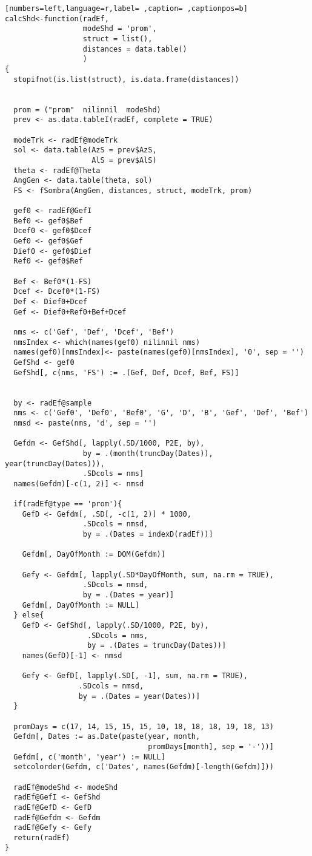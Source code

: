 \begin{lstlisting}[numbers=left,language=r,label= ,caption= ,captionpos=b]
calcShd<-function(radEf,
                  modeShd = 'prom',      
                  struct = list(), 
                  distances = data.table() 
                  )
{
  stopifnot(is.list(struct), is.data.frame(distances))


  prom = ("prom"  nilinnil  modeShd)
  prev <- as.data.tableI(radEf, complete = TRUE)

  modeTrk <- radEf@modeTrk
  sol <- data.table(AzS = prev$AzS,
                    AlS = prev$AlS)
  theta <- radEf@Theta
  AngGen <- data.table(theta, sol)
  FS <- fSombra(AngGen, distances, struct, modeTrk, prom)

  gef0 <- radEf@GefI
  Bef0 <- gef0$Bef
  Dcef0 <- gef0$Dcef
  Gef0 <- gef0$Gef
  Dief0 <- gef0$Dief
  Ref0 <- gef0$Ref

  Bef <- Bef0*(1-FS)
  Dcef <- Dcef0*(1-FS)
  Def <- Dief0+Dcef
  Gef <- Dief0+Ref0+Bef+Dcef 

  nms <- c('Gef', 'Def', 'Dcef', 'Bef')
  nmsIndex <- which(names(gef0) nilinnil nms)
  names(gef0)[nmsIndex]<- paste(names(gef0)[nmsIndex], '0', sep = '')
  GefShd <- gef0
  GefShd[, c(nms, 'FS') := .(Gef, Def, Dcef, Bef, FS)]


  by <- radEf@sample
  nms <- c('Gef0', 'Def0', 'Bef0', 'G', 'D', 'B', 'Gef', 'Def', 'Bef')
  nmsd <- paste(nms, 'd', sep = '')

  Gefdm <- GefShd[, lapply(.SD/1000, P2E, by),
                  by = .(month(truncDay(Dates)), year(truncDay(Dates))),
                  .SDcols = nms]
  names(Gefdm)[-c(1, 2)] <- nmsd

  if(radEf@type == 'prom'){
    GefD <- Gefdm[, .SD[, -c(1, 2)] * 1000,
                  .SDcols = nmsd,
                  by = .(Dates = indexD(radEf))] 

    Gefdm[, DayOfMonth := DOM(Gefdm)]

    Gefy <- Gefdm[, lapply(.SD*DayOfMonth, sum, na.rm = TRUE),
                  .SDcols = nmsd,
                  by = .(Dates = year)]
    Gefdm[, DayOfMonth := NULL]
  } else{    
    GefD <- GefShd[, lapply(.SD/1000, P2E, by),
                   .SDcols = nms,
                   by = .(Dates = truncDay(Dates))]
    names(GefD)[-1] <- nmsd

    Gefy <- GefD[, lapply(.SD[, -1], sum, na.rm = TRUE),
                 .SDcols = nmsd,
                 by = .(Dates = year(Dates))]
  }

  promDays = c(17, 14, 15, 15, 15, 10, 18, 18, 18, 19, 18, 13)
  Gefdm[, Dates := as.Date(paste(year, month,
                                 promDays[month], sep = '-'))]
  Gefdm[, c('month', 'year') := NULL]
  setcolorder(Gefdm, c('Dates', names(Gefdm)[-length(Gefdm)]))

  radEf@modeShd <- modeShd
  radEf@GefI <- GefShd
  radEf@GefD <- GefD
  radEf@Gefdm <- Gefdm
  radEf@Gefy <- Gefy
  return(radEf)
}
\end{lstlisting}
